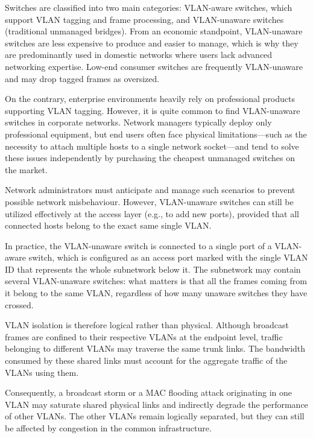 Switches are classified into two main categories: VLAN-aware switches, which support VLAN tagging and frame processing, and VLAN-unaware switches (traditional unmanaged bridges). From an economic standpoint, VLAN-unaware switches are less expensive to produce and easier to manage, which is why they are predominantly used in domestic networks where users lack advanced networking expertise. Low-end consumer switches are frequently VLAN-unaware and may drop tagged frames as oversized.

On the contrary, enterprise environments heavily rely on professional products supporting VLAN tagging. However, it is quite common to find VLAN-unaware switches in corporate networks. Network managers typically deploy only professional equipment, but end users often face physical limitations—such as the necessity to attach multiple hosts to a single network socket—and tend to solve these issues independently by purchasing the cheapest unmanaged switches on the market.

Network administrators must anticipate and manage such scenarios to prevent possible network misbehaviour. However, VLAN-unaware switches can still be utilized effectively at the access layer (e.g., to add new ports), provided that all connected hosts belong to the exact same single VLAN.

In practice, the VLAN-unaware switch is connected to a single port of a VLAN-aware switch, which is configured as an access port marked with the single VLAN ID that represents the whole subnetwork below it. The subnetwork may contain several VLAN-unaware switches: what matters is that all the frames coming from it belong to the same VLAN, regardless of how many unaware switches they have crossed.
\begin{center}
\end{center}



VLAN isolation is therefore logical rather than physical. Although broadcast frames are confined to their respective VLANs at the endpoint level, traffic belonging to different VLANs may traverse the same trunk links. The bandwidth consumed by these shared links must account for the aggregate traffic of the VLANs using them.

Consequently, a broadcast storm or a MAC flooding attack originating in one VLAN may saturate shared physical links and indirectly degrade the performance of other VLANs. The other VLANs remain logically separated, but they can still be affected by congestion in the common infrastructure.
